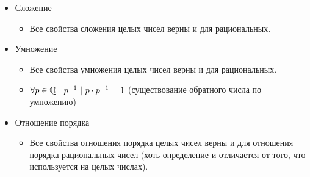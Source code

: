 \begin{itemize}
    \item Сложение
    \begin{itemize}
        \item Все свойства сложения целых чисел верны и для рациональных.
    \end{itemize}
    \item Умножение
    \begin{itemize}
        \item Все свойства умножения целых чисел верны и для рациональных.
        \item $\forall p \in \mathbb{Q}\ \exists p^{-1}\ |\ p \cdot p^{-1} = 1$ (существование обратного числа по умножению)
    \end{itemize}
    \item Отношение порядка
    \begin{itemize}
        \item Все свойства отношения порядка целых чисел верны и для отношения порядка рациональных чисел (хоть определение и отличается от того, что используется на целых числах).
    \end{itemize}
\end{itemize}
